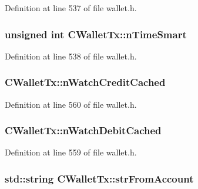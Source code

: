 Definition at line 537 of file wallet.\+h.

\hypertarget{class_c_wallet_tx_a3c9ba52ce7203b9f16235785a09c383c}{}
\subsubsection[{n\+Time\+Smart}]{\setlength{\rightskip}{0pt plus 5cm}unsigned int C\+Wallet\+Tx\+::n\+Time\+Smart}\label{class_c_wallet_tx_a3c9ba52ce7203b9f16235785a09c383c}


Definition at line 538 of file wallet.\+h.

\hypertarget{class_c_wallet_tx_ad5585350b3917d52e0f0c54fbd8f48ba}{}
\subsubsection[{n\+Watch\+Credit\+Cached}]{ C\+Wallet\+Tx\+::n\+Watch\+Credit\+Cached\hspace{0.3cm}{\ttfamily [mutable]}}\label{class_c_wallet_tx_ad5585350b3917d52e0f0c54fbd8f48ba}


Definition at line 560 of file wallet.\+h.

\hypertarget{class_c_wallet_tx_aae59608618174f5c2dc4fa6036ffb76b}{}
\subsubsection[{n\+Watch\+Debit\+Cached}]{ C\+Wallet\+Tx\+::n\+Watch\+Debit\+Cached\hspace{0.3cm}{\ttfamily [mutable]}}\label{class_c_wallet_tx_aae59608618174f5c2dc4fa6036ffb76b}


Definition at line 559 of file wallet.\+h.

\hypertarget{class_c_wallet_tx_a099b5ca562f8a8378124b345b9123f25}{}
\subsubsection[{str\+From\+Account}]{\setlength{\rightskip}{0pt plus 5cm}std\+::string C\+Wallet\+Tx\+::str\+From\+Account}\label{class_c_wallet_tx_a099b5ca562f8a8378124b345b9123f25}


